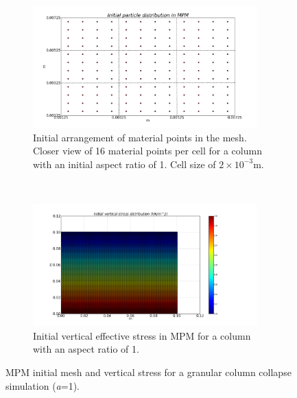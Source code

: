 \begin{figure}[tbhp]
\centering
\begin{subfigure}[b]{0.95\textwidth}
\centering
\includegraphics[width=0.95\textwidth]{ini_mesh_mpm_column}
\caption{Initial arrangement of material points in the mesh. Closer view of 
16 material points per cell for a column with an initial aspect ratio of 1. 
Cell size of $2\times10^{-3}\si{\m}$.}
\label{fig:ini_mesh_mpm_column}
\end{subfigure}
\\
\begin{subfigure}[b]{0.95\textwidth}
\centering
\includegraphics[width=0.95\textwidth]{ini_stress_mpm_column}
\caption{Initial vertical effective stress in MPM for a column with an aspect 
ratio of 1.}
\label{fig:ini_stress_mpm_column}
\end{subfigure}
\caption{MPM initial mesh and vertical stress for a granular column collapse 
simulation (\textit{a}=1).}
\label{fig:MPM_Sample}
\end{figure}



